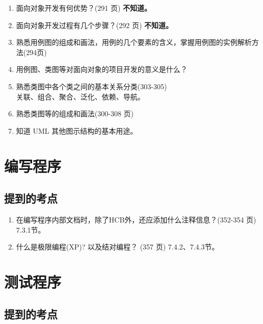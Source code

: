 \documentclass[14pt, letterpaper, UTF8, fontset=windowsnew, heading=true]{article}
\begin{document}
\begin{enumerate}
	\item 面向对象开发有何优势？(291 页)
	\textbf{不知道。}
	
	\item 面向对象开发过程有几个步骤？(292 页)
	\textbf{不知道。}
	
	\item 熟悉用例图的组成和画法，用例的几个要素的含义，掌握用例图的实例解析方法(294页)
	
	\item 用例图、类图等对面向对象的项目开发的意义是什么？
	
	\item 熟悉类图中各个类之间的基本关系分类(303-305) \\
	关联、组合、聚合、泛化、依赖、导航。
	
	\item 熟悉类图等的组成和画法(300-308 页)
	
	\item 知道 UML 其他图示结构的基本用途。
	
\end{enumerate}

\section{编写程序}

\subsection{提到的考点}

\begin{enumerate}
	\item 在编写程序内部文档时，除了HCB外，还应添加什么注释信息？(352-354 页) \\
	7.3.1节。
	
	\item 什么是极限编程(XP)? 以及结对编程？ (357 页)
	7.4.2、7.4.3节。
	
\end{enumerate}

\section{测试程序}

\subsection{提到的考点}
\end{document}
